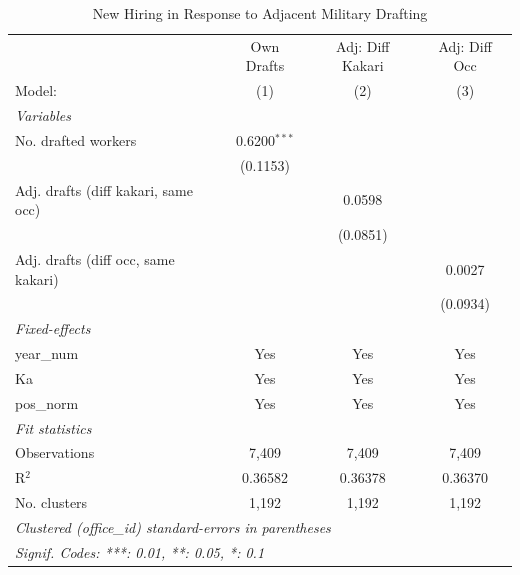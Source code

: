 \begin{table}[htbp]
\centering
\caption{New Hiring in Response to Adjacent Military Drafting}
\label{tab:reallocation-adjacent}
\begin{threeparttable}
\begin{tabular}{lccc}
   \tabularnewline \midrule \midrule
                                       & Own Drafts     & Adj: Diff Kakari & Adj: Diff Occ \\   
   Model:                              & (1)            & (2)              & (3)\\  
   \midrule
   \emph{Variables}\\
   No. drafted workers                 & 0.6200$^{***}$ &                  &   \\   
                                       & (0.1153)       &                  &   \\   
   Adj. drafts (diff kakari, same occ) &                & 0.0598           &   \\   
                                       &                & (0.0851)         &   \\   
   Adj. drafts (diff occ, same kakari) &                &                  & 0.0027\\   
                                       &                &                  & (0.0934)\\   
   \midrule
   \emph{Fixed-effects}\\
   year\_num                           & Yes            & Yes              & Yes\\  
   Ka                                  & Yes            & Yes              & Yes\\  
   pos\_norm                           & Yes            & Yes              & Yes\\  
   \midrule
   \emph{Fit statistics}\\
   Observations                        & 7,409          & 7,409            & 7,409\\  
   R$^2$                               & 0.36582        & 0.36378          & 0.36370\\  
   No. clusters      & 1,192          & 1,192            & 1,192\\  
   \midrule \midrule
   \multicolumn{4}{l}{\emph{Clustered (office\_id) standard-errors in parentheses}}\\
   \multicolumn{4}{l}{\emph{Signif. Codes: ***: 0.01, **: 0.05, *: 0.1}}\\
\end{tabular}

\end{threeparttable}
\end{table}
